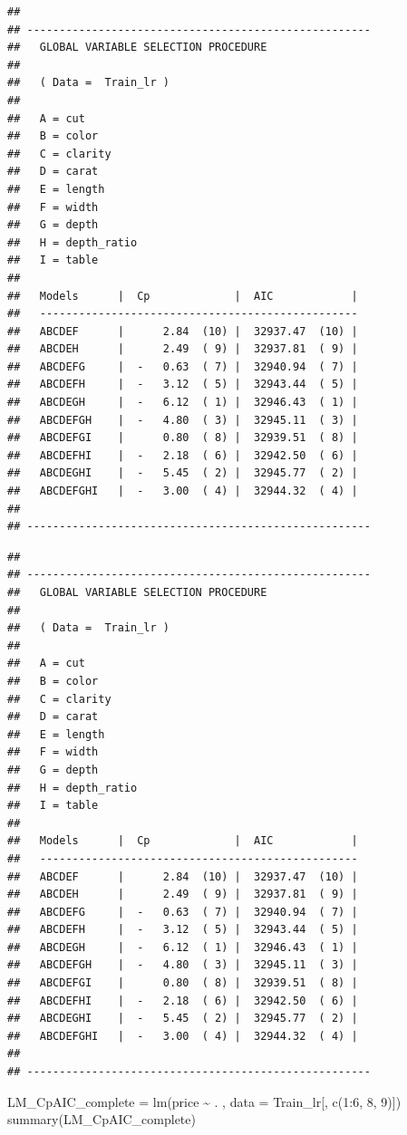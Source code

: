 \documentclass[
]{article}
\newenvironment{Shaded}{\begin{snugshade}}{\end{snugshade}}
\newcommand{\AttributeTok}[1]{\textcolor[rgb]{0.77,0.63,0.00}{#1}}
\newcommand{\DecValTok}[1]{\textcolor[rgb]{0.00,0.00,0.81}{#1}}
\newcommand{\FunctionTok}[1]{\textcolor[rgb]{0.00,0.00,0.00}{#1}}
\newcommand{\NormalTok}[1]{#1}
\newcommand{\OtherTok}[1]{\textcolor[rgb]{0.56,0.35,0.01}{#1}}
\newcommand{\SpecialCharTok}[1]{\textcolor[rgb]{0.00,0.00,0.00}{#1}}
\begin{document}
\begin{verbatim}
##
## -----------------------------------------------------
##   GLOBAL VARIABLE SELECTION PROCEDURE
##
##   ( Data =  Train_lr )
##
##   A = cut
##   B = color
##   C = clarity
##   D = carat
##   E = length
##   F = width
##   G = depth
##   H = depth_ratio
##   I = table
##
##   Models      |  Cp             |  AIC            |
##   -------------------------------------------------
##   ABCDEF      |      2.84  (10) |  32937.47  (10) |
##   ABCDEH      |      2.49  ( 9) |  32937.81  ( 9) |
##   ABCDEFG     |  -   0.63  ( 7) |  32940.94  ( 7) |
##   ABCDEFH     |  -   3.12  ( 5) |  32943.44  ( 5) |
##   ABCDEGH     |  -   6.12  ( 1) |  32946.43  ( 1) |
##   ABCDEFGH    |  -   4.80  ( 3) |  32945.11  ( 3) |
##   ABCDEFGI    |      0.80  ( 8) |  32939.51  ( 8) |
##   ABCDEFHI    |  -   2.18  ( 6) |  32942.50  ( 6) |
##   ABCDEGHI    |  -   5.45  ( 2) |  32945.77  ( 2) |
##   ABCDEFGHI   |  -   3.00  ( 4) |  32944.32  ( 4) |
##
## -----------------------------------------------------
\end{verbatim}

\begin{verbatim}
##
## -----------------------------------------------------
##   GLOBAL VARIABLE SELECTION PROCEDURE
##
##   ( Data =  Train_lr )
##
##   A = cut
##   B = color
##   C = clarity
##   D = carat
##   E = length
##   F = width
##   G = depth
##   H = depth_ratio
##   I = table
##
##   Models      |  Cp             |  AIC            |
##   -------------------------------------------------
##   ABCDEF      |      2.84  (10) |  32937.47  (10) |
##   ABCDEH      |      2.49  ( 9) |  32937.81  ( 9) |
##   ABCDEFG     |  -   0.63  ( 7) |  32940.94  ( 7) |
##   ABCDEFH     |  -   3.12  ( 5) |  32943.44  ( 5) |
##   ABCDEGH     |  -   6.12  ( 1) |  32946.43  ( 1) |
##   ABCDEFGH    |  -   4.80  ( 3) |  32945.11  ( 3) |
##   ABCDEFGI    |      0.80  ( 8) |  32939.51  ( 8) |
##   ABCDEFHI    |  -   2.18  ( 6) |  32942.50  ( 6) |
##   ABCDEGHI    |  -   5.45  ( 2) |  32945.77  ( 2) |
##   ABCDEFGHI   |  -   3.00  ( 4) |  32944.32  ( 4) |
##
## -----------------------------------------------------
\end{verbatim}

\begin{Shaded}
\begin{Highlighting}[]
\NormalTok{LM\_CpAIC\_complete }\OtherTok{=} \FunctionTok{lm}\NormalTok{(price }\SpecialCharTok{\textasciitilde{}}\NormalTok{ . , }\AttributeTok{data =}\NormalTok{ Train\_lr[, }\FunctionTok{c}\NormalTok{(}\DecValTok{1}\SpecialCharTok{:}\DecValTok{6}\NormalTok{, }\DecValTok{8}\NormalTok{, }\DecValTok{9}\NormalTok{)])}
\FunctionTok{summary}\NormalTok{(LM\_CpAIC\_complete)}
\end{Highlighting}
\end{Shaded}
\end{document}
